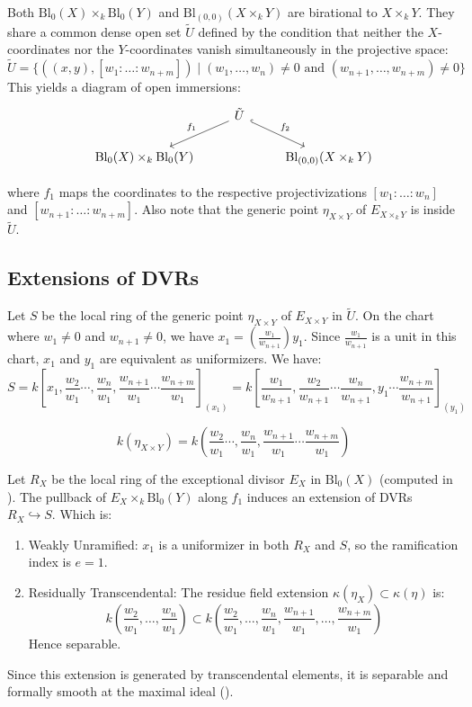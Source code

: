 Both $\text{Bl}_0(X) \times_k \text{Bl}_0(Y)$ and $\text{Bl}_{(0,0)}(X \times_k Y)$ are birational to $X \times_k Y$.
They share a common dense open set $\tilde{U}$ defined by the condition that neither the $X$-coordinates nor the $Y$-coordinates vanish simultaneously in the projective space:
$$\tilde{U} = \{ ((x,y), [w_1: \dots : w_{n+m}]) \mid (w_1, \dots, w_n) \neq 0 \text{ and } (w_{n+1}, \dots, w_{n+m}) \neq 0 \}$$This yields a diagram of open immersions:
$$
   \begin{tikzcd}
        & \tilde{U} \arrow[dl, "f_1"'] \arrow[dr, "f_2", hook] & \\
        \text{Bl}_0(X) \times_k \text{Bl}_0(Y) & & \text{Bl}_{(0,0)}(X \times_k Y)
    \end{tikzcd}
$$

    where $f_1$ maps the coordinates to the respective projectivizations $[w_1: \dots : w_n]$ and $[w_{n+1}: \dots : w_{n+m}]$.
    Also note that the generic point $\eta_{X \times Y}$  of $E_{X \times_k Y}$ is inside $\tilde{U}$.

\subsection*{Extensions of DVRs}
Let $S$ be the local ring of the generic point $\eta_{X\times Y}$ of $E_{X \times Y}$ in $\tilde{U}$.
On the chart where $w_1 \neq 0$ and $w_{n+1} \neq 0$, we have
$x_1 = (\frac{w_1}{w_{n+1}}) y_1$.
Since $\frac{w_1}{w_{n+1}}$ is a unit in this chart, $x_1$ and $y_1$ are equivalent as uniformizers.
We have:
$$
S=k\left[x_1, \frac{w_2}{w_1} \cdots, \frac{w_n}{w_1}, \frac{w_{n+1}}{w_1} \cdots \frac{w_{n+m}}{w_1}\right]_{(x_1)} =
k\left[\frac{w_1}{w_{n+1}}, \frac{w_2}{w_{n+1}} \cdots \frac{w_n}{w_{n+1}}, y_1 \cdots \frac{w_{n+m}}{w_{n+1}}\right]_{(y_1)}
$$

$$k(\eta_{X \times Y}) = k\left(\frac{w_2}{w_1} \cdots, \frac{w_n}{w_1}, \frac{w_{n+1}}{w_1} \cdots \frac{w_{n+m}}{w_1}\right)$$

Let $R_X$ be the local ring of the exceptional divisor $E_X$ in $\text{Bl}_0(X)$
(computed in ).
The pullback of $E_X \times_k \text{Bl}_0(Y)$ along $f_1$ induces an extension of DVRs $R_X \hookrightarrow S$. Which is:
\begin{enumerate}
    \item Weakly Unramified: $x_1$ is a uniformizer in both $R_X$ and $S$, so the ramification index is $e=1$.
    \item Residually Transcendental: The residue field extension $\kappa(\eta_X) \subset \kappa(\eta)$ is:
    $$k\left(\frac{w_2}{w_1}, \dots, \frac{w_n}{w_1}\right) \subset k\left(\frac{w_2}{w_1}, \dots, \frac{w_n}{w_1}, \frac{w_{n+1}}{w_1}, \dots, \frac{w_{n+m}}{w_1}\right)$$
    Hence separable.
\end{enumerate}
Since this extension is generated by transcendental elements, it is separable and formally smooth at the maximal ideal ().

